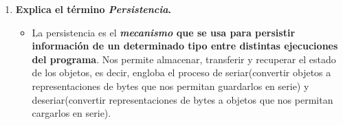 \documentclass{report}
\begin{document}
\begin{enumerate}
\begin{itemize}
            \end{itemize}
        \item \textbf{Explica el término \textit{Persistencia}.}
            \begin{itemize}
                \item La persistencia es el \textbf{\textit{mecanismo} que se usa para persistir información de un determinado tipo
                    entre distintas ejecuciones del programa}. Nos permite almacenar, transferir y recuperar el estado
                      de los objetos, es decir, engloba el proceso de seriar(convertir objetos a representaciones de
                      bytes que nos permitan guardarlos en serie) y deseriar(convertir representaciones de bytes a objetos
                      que nos permitan cargarlos en serie).
            \end{itemize}
    \end{enumerate}
\end{document}
